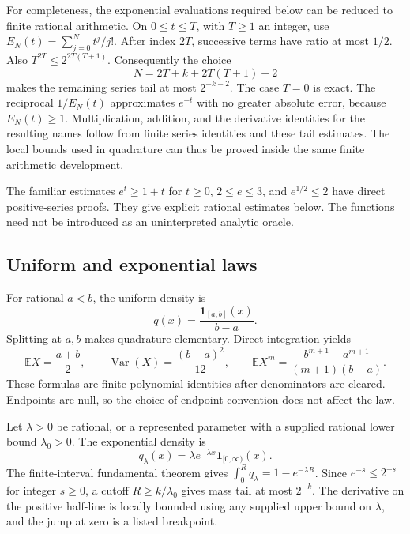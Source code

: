 For completeness, the exponential evaluations required below can be reduced
to finite rational arithmetic.  On $0\leq t\leq T$, with $T\geq1$ an integer,
use $E_N(t)=\sum_{j=0}^{N}t^j/j!$.  After index $2T$, successive terms have
ratio at most $1/2$.  Also
$T^{2T}\leq 2^{2T(T+1)}$.  Consequently the choice
\[
 N=2T+k+2T(T+1)+2
\]
makes the remaining series tail at most $2^{-k-2}$.  The case $T=0$ is exact.
The reciprocal $1/E_N(t)$ approximates $e^{-t}$ with no greater absolute
error, because $E_N(t)\geq1$.  Multiplication, addition, and the derivative
identities for the resulting names follow from finite series identities and
these tail estimates.  The local bounds used in quadrature can thus be
proved inside the same finite arithmetic development.

The familiar estimates $e^t\geq1+t$ for $t\geq0$, $2\leq e\leq3$, and
$e^{1/2}\leq2$ have direct positive-series proofs.  They give explicit
rational estimates below.  The functions need not be introduced as an
uninterpreted analytic oracle.

\subsection{Uniform and exponential laws}

For rational $a<b$, the uniform density is
\[
 q(x)=\frac{\mathbf1_{[a,b]}(x)}{b-a}.
\]
Splitting at $a,b$ makes quadrature elementary.  Direct integration yields
\[
 \mathbb E X=\frac{a+b}{2},\qquad
 \operatorname{Var}(X)=\frac{(b-a)^2}{12},\qquad
 \mathbb E X^m=\frac{b^{m+1}-a^{m+1}}{(m+1)(b-a)}.
\]
These formulas are finite polynomial identities after denominators are
cleared.  Endpoints are null, so the choice of endpoint convention does not
affect the law.

Let $\lambda>0$ be rational, or a represented parameter with a supplied
rational lower bound $\lambda_0>0$.  The exponential density is
\[
 q_\lambda(x)=\lambda e^{-\lambda x}\mathbf1_{[0,\infty)}(x).
\]
The finite-interval fundamental theorem gives
$\int_0^R q_\lambda=1-e^{-\lambda R}$.  Since $e^{-s}\leq2^{-s}$ for integer
$s\geq0$, a cutoff $R\geq k/\lambda_0$ gives mass tail at most $2^{-k}$.
The derivative on the positive half-line is locally bounded using any
supplied upper bound on $\lambda$, and the jump at zero is a listed
breakpoint.

